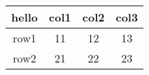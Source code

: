 \documentclass[12pt,a4paper,oneside]{article}
\begin{document}
    \begin{tabular}{ |c | c |c| c |}
            \hline
            hello & col1 & col2 & col3 \\
            \hline
            row1 & 11 & 12 & 13\\
            \hline
            row2 & 21 & 22 & 23\\
            \hline
            
    \end{tabular}
\end{document}
